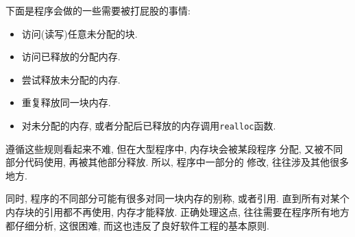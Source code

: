 \documentclass[12pt]{book}
\begin{document}
{%
下面是程序会做的一些需要被打屁股的事情:

\begin{itemize}

\item 访问(读写)任意未分配的块.

\item 访问已释放的分配内存. 

\item 尝试释放未分配的内存. 

\item 重复释放同一块内存.

\item 对未分配的内存, 或者分配后已释放的内存调用{\tt realloc}函数. 

\end{itemize}

遵循这些规则看起来不难, 但在大型程序中, 内存块会被某段程序
分配, 又被不同部分代码使用, 再被其他部分释放. 所以, 程序中一部分的
修改, 往往涉及其他很多地方.  

同时, 程序的不同部分可能有很多对同一块内存的别称, 或者引用. 
直到所有对某个内存块的引用都不再使用, 内存才能释放. 
正确处理这点, 往往需要在程序所有地方都仔细分析, 这很困难, 
而这也违反了良好软件工程的基本原则.

}
\end{document}
